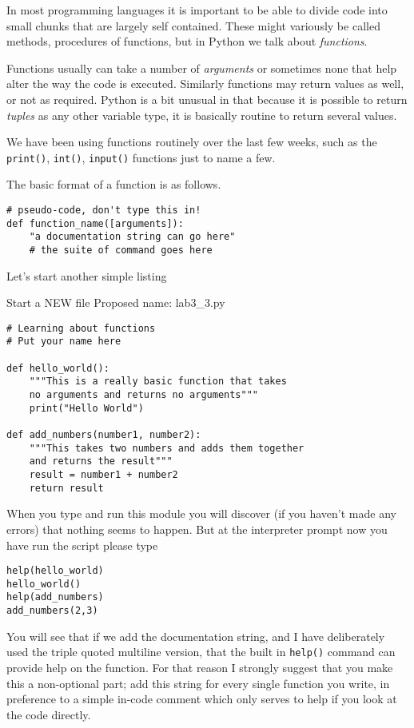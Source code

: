 \documentclass[12pt,oneside]{cttutorial}
\begin{document}
In most programming languages it is important to be able to divide code into small chunks that are largely self contained. These might variously be called methods, procedures of functions, but in Python we talk about \emph{functions}.

Functions usually can take a number of \emph{arguments} or sometimes none that help alter the way the code is executed. Similarly functions may return values as well, or not as required. Python is a bit unusual in that because it is possible to return \emph{tuples} as any other variable type, it is basically routine to return several values.

We have been using functions routinely over the last few weeks, such as the \lstinline!print()!, \lstinline!int()!, \lstinline!input()! functions just to name a few.

The basic format of a function is as follows.

\begin{lstlisting}
# pseudo-code, don't type this in!
def function_name([arguments]):
    "a documentation string can go here"
    # the suite of command goes here
\end{lstlisting}

Let's start another simple listing

\alert{Start a NEW file}
Proposed name: lab3\_3.py
\begin{lstlisting}
# Learning about functions
# Put your name here

def hello_world():
    """This is a really basic function that takes
    no arguments and returns no arguments"""
    print("Hello World")

def add_numbers(number1, number2):
    """This takes two numbers and adds them together
    and returns the result"""
    result = number1 + number2
    return result

\end{lstlisting}

When you type and run this module you will discover (if you haven't
made any errors) that nothing seems to happen. But at the interpreter prompt now you have run the script please type

\begin{lstlisting}
help(hello_world)
hello_world()
help(add_numbers)
add_numbers(2,3)
\end{lstlisting}

You will see that if we add the documentation string, and I have deliberately used the triple quoted multiline version, that the built in \lstinline!help()! command can provide help on the function. For that reason I strongly suggest that you make this a non-optional part; add this string for every single function you write, in preference to a simple in-code comment which only serves to help if you look at the code directly.
\end{document}
